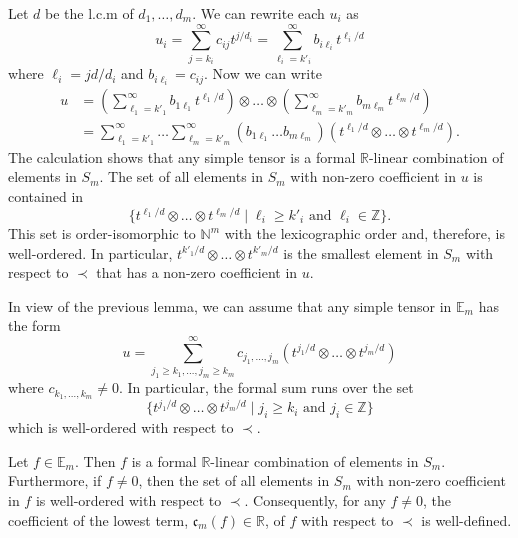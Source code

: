 \documentclass{amsart}
\makeatletter
\renewenvironment{proof}[1][\proofname]{%
   \par\pushQED{\qed}\normalfont%
   \topsep6\p@\@plus6\p@\relax
   \trivlist\item[\hskip\labelsep\bfseries#1\@addpunct{.}]%
   \ignorespaces
}{%
   \popQED\endtrivlist\@endpefalse
}
\makeatother
\begin{document}
\begin{proof}[Proof of \cref{prop:OrderingOnTensorPowerOfPuiseuxField}]
    \begin{proof}
        Let $d$ be the l.c.m of $d_1,\dots,d_m$. We can rewrite each $u_i$ as 
        \[
        u_i = \sum\limits_{j=k_i}^{\infty} c_{ij}t^{j/d_i} = \sum\limits_{\ell_i=k'_i}^{\infty} b_{i\ell_i}t^{\ell_i/d}
        \]
        where $\ell_i = jd/d_i$ and $b_{i\ell_i} = c_{ij}$. Now we can write 
        \begin{align*}
            u 
            &= \left(\sum\limits_{\ell_1=k'_1}^{\infty} b_{1\ell_1}t^{\ell_1/d}\right) \otimes \dots \otimes \left(\sum\limits_{\ell_m=k'_m}^{\infty} b_{m\ell_m}t^{\ell_m/d}\right) \\
            &= \sum\limits_{\ell_1=k'_1}^{\infty}\dots\sum\limits_{\ell_m=k'_m}^{\infty}\left(b_{1\ell_1}\dots b_{m\ell_m}\right)\left(t^{\ell_1/d} \otimes \dots \otimes t^{\ell_m/d}\right).
        \end{align*}
         The calculation shows that any simple tensor is a formal $\mathbb{R}$-linear combination of elements in $S_m$. The set of all elements in $S_m$ with non-zero coefficient in $u$ is contained in 
        \[
        \{ t^{\ell_1/d} \otimes \dots \otimes t^{\ell_m/d} \mid \ell_i \geq k'_i \text{ and } \ell_i \in \mathbb{Z}\}.
        \]       
        This set is order-isomorphic to $\mathbb{N}^m$ with the lexicographic order and, therefore, is well-ordered. In particular, $t^{k'_1/d} \otimes \dots \otimes t^{k'_m/d}$ is the smallest element in $S_m$ with respect to $\prec$ that has a non-zero coefficient in $u$. 
    \end{proof}

    In view of the previous lemma, we can assume that any simple tensor in $\mathbb{E}_m$ has the form 
    \[
    u = \sum\limits_{j_1 \geq k_1,\dots,j_m \geq k_m}^\infty c_{j_1,\dots,j_m} (t^{j_1/d} \otimes \dots \otimes t^{j_m/d})
    \]
    where $c_{k_1,\dots,k_m} \neq 0$. In particular, the formal sum runs over the set 
    \[
        \{ t^{j_1/d} \otimes \dots \otimes t^{j_m/d} \mid j_i \geq k_i \text{ and } j_i \in \mathbb{Z}\}
    \]
    which is well-ordered with respect to $\prec$. 
    \begin{lem}
    \label{lem:WellDefinedLowestTerm}
        Let $f \in \mathbb{E}_m$. Then $f$ is a formal $\mathbb{R}$-linear combination of elements in $S_m$. Furthermore, if $f\neq 0$, then the set of all elements in $S_m$ with non-zero coefficient in $f$ is well-ordered with respect to $\prec$. Consequently, for any $f \neq 0$, the coefficient of the lowest term, $\mathfrak{c}_m(f) \in \mathbb{R}$, of $f$ with respect to $\prec$ is well-defined. 
    \end{lem}


\end{proof}
\end{document}
